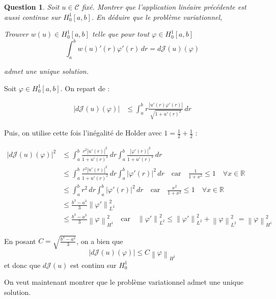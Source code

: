 \documentclass{article}
\newcommand{\Real}{ \mathbb{R} }
\newcommand{\Abs}[1]{ \left| #1 \right| }
\newcommand{\FunctionWithSqrt}[1]{ \sqrt{1 + #1 ^2} }
\newcommand{\Norm}[2]{ \left\| #1 \right\|_{#2} }
\newcommand{\Integral}[4]{ \int_{#1}^{#2} #3 \, d#4 }
\newtheorem{question}{Question}[subsection]
\newenvironment{answer}
  {\color{blue}}
  {}
\newcommand{\QuestionAnswer}[2]{
    \begin{question}
        #1
    \end{question}
    \begin{answer}
        #2
    \end{answer}
}
\newcommand{\SetC}{\mathcal{C}}
\newcommand{\FunctionJ}{\mathcal{J}}
\begin{document}
\QuestionAnswer{
    Soit $u \in \SetC$ fixé. Montrer que l'application linéaire précédente est aussi continue 
    sur $H^1_0[a, b]$. En déduire que le problème variationnel,

    Trouver $w(u) \in H^1_0[a, b]$ telle que pour tout $\varphi \in H^1_0[a, b]$
    $$\Integral{a}{b}{ w(u)'(r) \varphi'(r) }{r}= d\FunctionJ(u)(\varphi)$$

    admet une unique solution.
}{
    Soit $\varphi \in H^1_0[a, b]$. On repart de :

    \begin{align*}
        \Abs{d\FunctionJ(u)(\varphi)} &\leq \Integral{a}{b}{ r \frac{\Abs{u'(r)\varphi'(r)}}{\FunctionWithSqrt{u'(r)}} }{r}
    \end{align*}

    Puis, on utilise cette fois l'inégalité de Holder avec $ 1 = \frac{1}{2} + \frac{1}{2}$ :
    
    \begin{align*}
        \Abs{d\FunctionJ(u)(\varphi)}^2
        &\leq \Integral{a}{b}{ \frac{ r^2 \Abs{u'(r)}^2 }{1 + u'(r)^2} }{r} \Integral{a}{b}{ \frac{\Abs{\varphi'(r)}^2 }{1 + u'(r)^2} }{r} \\
        &\leq \Integral{a}{b}{ \frac{ r^2 \Abs{u'(r)}^2 }{1 + u'(r)^2} }{r} \Integral{a}{b}{ \Abs{\varphi'(r)}^2 }{r} \quad \text{car} \quad \frac{1}{1 + x^2} \leq 1 \quad \forall x \in \Real \\
        &\leq \Integral{a}{b}{ r^2 }{r} \Integral{a}{b}{ \Abs{\varphi'(r)}^2 }{r} \quad \text{car} \quad \frac{x^2}{1 + x^2} \leq 1 \quad \forall x \in \Real \\
        &\leq \frac{b^3-a^3}{3} \Norm{\varphi'}{L^2}^2 \\
        &\leq \frac{b^3-a^3}{3} \Norm{\varphi}{H^1}^2 \quad \text{car} \quad \Norm{\varphi'}{L^2}^2 \leq \Norm{\varphi'}{L^2}^2 + \Norm{\varphi}{L^2}^2 = \Norm{\varphi}{H^1}^2
    \end{align*}

    En posant $C = \sqrt{\frac{b^3-a^3}{3}}$, on a bien que 
    $$\Abs{d\FunctionJ(u)(\varphi)} \leq C \Norm{\varphi}{H^1}$$
    et donc que $d\FunctionJ(u)$ est continu sur $H^1_0$\newline


    On veut maintenant montrer que le problème variationnel admet une unique solution.

}
\end{document}
